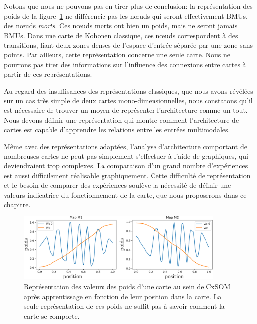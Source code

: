 Notons que nous ne pouvons pas en tirer plus de conclusion: la représentation des poids de la figure~\ref{fig:weights} ne différencie pas les n\oe{}uds qui seront effectivement BMUs, des n\oe{}uds \emph{morts}. Ces n\oe{}uds morts ont bien un poids, mais ne seront jamais BMUs. Dans une carte de Kohonen classique, ces n\oe{}uds correspondent à des transitions, liant deux zones denses de l'espace d'entrée séparée par une zone sans points.
Par ailleurs, cette représentation concerne une seule carte. Nous ne pourrons pas tirer des informations sur l'influence des connexions entre cartes à partir de ces représentations.

Au regard des insuffisances des représentations classiques, que nous avons révélées sur un cas très simple de deux cartes mono-dimensionnelles, nous constatons qu'il est nécessaire de trouver un moyen de représenter l'architecture comme un tout. Nous devons définir une représentation qui montre comment l'architecture de cartes est capable d'apprendre les relations entre les entrées multimodales.

Même avec des représentations adaptées, l'analyse d'architecture comportant de nombreuses cartes ne peut pas simplement s'effectuer à l'aide de graphiques, qui deviendraient trop complexes.
La comparaison d'un grand nombre d'expériences est aussi difficilement réalisable graphiquement.
Cette difficulté de représentation et le besoin de comparer des expériences soulève la nécessité de définir une valeurs indicatrice du fonctionnement de la carte, que nous proposerons dans ce chapitre.


\begin{figure}
\centering
\includegraphics[width=0.9\textwidth]{weights_cercle1.pdf}

\caption{Représentation des valeurs des poids d'une carte au sein de CxSOM après apprentissage en fonction de leur position dans la carte. La seule représentation de ces poids ne suffit pas à savoir comment la carte se comporte.\label{fig:weights}}
\end{figure}

